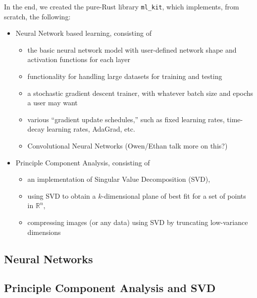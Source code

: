 \documentclass[12pt, letterpaper]{article}
\theoremstyle{definition}
\theoremstyle{remark}
\newcommand{\R}{\mathbb{R}}
\begin{document}
In the end, we created the pure-Rust library \texttt{ml\_kit}, which implements, from scratch, the following:
\begin{itemize}
    \item Neural Network based learning, consisting of
    \begin{itemize}
        \item the basic neural network model with user-defined network shape and activation functions 
        for each layer
        \item functionality for handling large datasets for training and testing
        \item a stochastic gradient descent trainer, with whatever batch size and epochs a user may want
        \item various ``gradient update schedules,'' such as fixed learning rates, time-decay learning rates, AdaGrad, etc.
        \item Convolutional Neural Networks (Owen/Ethan talk more on this?)
    \end{itemize}
    \item Principle Component Analysis, consisting of
    \begin{itemize}
        \item an implementation of Singular Value Decomposition (SVD),
        \item using SVD to obtain a $k$-dimensional plane of best fit for a set of points in $\R^n$,
        \item compressing images (or any data) using SVD by truncating low-variance dimensions
    \end{itemize}
\end{itemize}

\subsection{Neural Networks}

\subsection{Principle Component Analysis and SVD}
\end{document}
